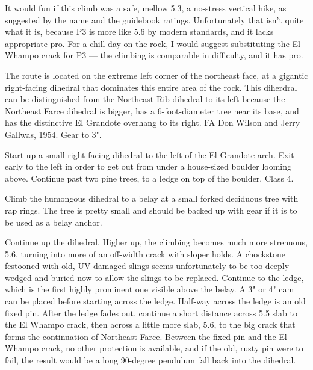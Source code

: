 \documentclass{tahquitz}
\begin{document}
\northgully





It would fun if this climb was a safe, mellow 5.3, a no-stress
vertical hike, as suggested by the name and the guidebook ratings.
Unfortunately that isn't quite what it is, because P3 is more like 5.6
by modern standards, and it lacks appropriate pro. For a chill day on the
rock, I would suggest substituting the El Whampo crack for P3 --- the climbing
is comparable in difficulty, and it has pro.

The route is located on the extreme left corner of the northeast
face, at a gigantic right-facing dihedral that dominates this entire area of the
rock. This diherdral can be distinguished from the Northeast Rib dihedral to its left
because the Northeast Farce dihedral is bigger, has a 6-foot-diameter tree near its base,
and has the distinctive El Grandote overhang to its right.
FA Don Wilson and Jerry Gallwas, 1954. Gear to 3".

\somespace

 Start up a small right-facing dihedral to the left of the El Grandote arch.
Exit early to the left in order to get out from under a house-sized boulder
looming above. Continue past two pine trees, to
a ledge on top of the boulder.
Class 4.

 Climb the humongous dihedral to a belay at a small forked deciduous tree with rap
rings. The tree is pretty small and should be backed up with gear if it is to be
used as a belay anchor.

 Continue up the dihedral.
Higher up, the climbing becomes much more strenuous, 5.6, turning
into more of an off-width crack with sloper holds. A chockstone festooned with
old, UV-damaged slings seems unfortunately to be too deeply wedged and buried
now to allow the slings to be replaced. Continue to the ledge, which is the first
highly prominent one visible above the belay. A 3" or 4" cam can be placed before
starting across the ledge. Half-way across the ledge is an old fixed pin. After the
ledge fades out, continue a short distance across 5.5 slab to the El Whampo crack,
then across a little more slab, 5.6, to the big crack that forms the continuation
of Northeast Farce.
Between the fixed pin and the El Whampo crack, no other protection is available,
and if the old, rusty pin were to fail, the result would be a long 90-degree pendulum
fall back into the dihedral.
\end{document}

